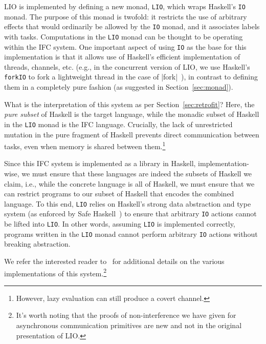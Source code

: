 LIO is implemented by defining a new monad, \verb|LIO|, which wraps Haskell's \verb|IO|
monad.
%
The purpose of this monad is twofold: it restricts the use of
arbitrary effects that would ordinarily be allowed by the \verb|IO| monad,
and it associates labels with tasks.
%
Computations in the \verb|LIO|
monad can be thought to be operating within the IFC system.
%
One important aspect of using \verb|IO| as the base for this
implementation is that it allows use of Haskell's efficient
implementation of threads, channels, etc. (e.g., in the concurrent
version of LIO, we use Haskell's \texttt{forkIO} to fork a lightweight
thread in the case of |fork|~\cite{stefan:addressing-covert}), in
contrast to defining them in a completely pure fashion (as suggested
in Section~\ref{sec:monad}).

What is the interpretation of this system as per Section~\ref{sec:retrofit}?
%
Here, the \emph{pure subset} of Haskell is the target language, while
the monadic subset of Haskell in the \verb|LIO| monad is the IFC
language.
%
Crucially, the lack of unrestricted mutation in the pure fragment of
Haskell prevents direct communication between tasks, even when memory is
shared between them.\footnote{However, lazy evaluation can still produce
a covert channel.}

Since this IFC system is implemented as a library in Haskell,
implementation-wise, we must ensure that these languages are indeed the subsets of Haskell
we claim, i.e., while the concrete language is all of Haskell, we must
ensure that we can restrict programs to our subset of Haskell that
encodes the combined language.
%
To this end, \verb|LIO| relies on Haskell's strong data abstraction and type system
(as enforced by Safe Haskell~\cite{Terei:2012:SH:2364506.2364524}) to
ensure that arbitrary \verb|IO| actions cannot be lifted into
\verb|LIO|.
%
In other words, assuming \verb|LIO| is implemented correctly, programs
written in the \verb|LIO| monad cannot perform arbitrary \verb|IO| actions
without breaking abstraction.

We refer the interested reader to~\cite{lio,stefan:addressing-covert} for
additional details on the various implementations of this system.\footnote{It's worth noting that the proofs of non-interference we have given for asynchronous communication primitives are new and not in the original presentation of LIO.}


